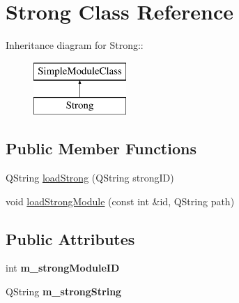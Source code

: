 \hypertarget{classStrong}{
\section{Strong Class Reference}
\label{classStrong}
}
Inheritance diagram for Strong::\begin{figure}[H]
\begin{center}
\leavevmode
\includegraphics[height=2cm]{classStrong}
\end{center}
\end{figure}
\subsection*{Public Member Functions}
\begin{DoxyCompactItemize}
\item 
QString \hyperlink{classStrong_a959af8bb7edc87e78c04f73837094724}{loadStrong} (QString strongID)
\item 
void \hyperlink{classStrong_ac29b6ad75969dd5ef690a82c15e18fe1}{loadStrongModule} (const int \&id, QString path)
\end{DoxyCompactItemize}
\subsection*{Public Attributes}
\begin{DoxyCompactItemize}
\item 
\hypertarget{classStrong_aca45c05b0f595a36f1ad9df3db509194}{
int {\bfseries m\_\-strongModuleID}}
\label{classStrong_aca45c05b0f595a36f1ad9df3db509194}

\item 
\hypertarget{classStrong_abd906be91ce0b70cc0b779da3ee65317}{
QString {\bfseries m\_\-strongString}}
\label{classStrong_abd906be91ce0b70cc0b779da3ee65317}

\end{DoxyCompactItemize}


